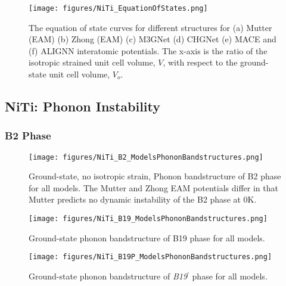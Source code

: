 \documentclass[preprint]{elsarticle}
\begin{document}
\begin{figure}[ht!]
    \begin{centering}
        \texttt{[image: figures/NiTi\_EquationOfStates.png]}
        \caption{
            The equation of state curves for different  structures for (a) Mutter (EAM) (b) Zhong (EAM) (c) M3GNet (d) CHGNet (e) MACE and (f) ALIGNN interatomic potentials. The x-axis is the ratio of the isotropic strained unit cell volume, $V$,  with respect to the ground-state unit cell volume, $V_o$.
        }
        \label{fig:eos}
    \end{centering}
\end{figure}

\subsection{NiTi: Phonon Instability}
\label{subsec:niphonons}


\subsubsection{B2 Phase}
\label{subsubsec:b2}

\begin{figure}[ht!]
    \begin{centering}
        \texttt{[image: figures/NiTi\_B2\_ModelsPhononBandstructures.png]}
        \caption{
          Ground-state, no isotropic strain, Phonon bandstructure of B2 phase for all models. The Mutter and Zhong EAM potentials differ in that Mutter predicts no dynamic instability of the B2 phase at 0K. 
        }
        \label{fig:allmodels_b2}
    \end{centering}
\end{figure}

\begin{figure}[ht!]
    \begin{centering}
        \texttt{[image: figures/NiTi\_B19\_ModelsPhononBandstructures.png]}
        \caption{
          Ground-state phonon bandstructure of B19 phase for all models.
        }
        \label{fig:allmodels_B19P}
    \end{centering}
\end{figure}

\begin{figure}[ht!]
    \begin{centering}
        \texttt{[image: figures/NiTi\_B19P\_ModelsPhononBandstructures.png]}
        \caption{
          Ground-state phonon bandstructure of \textit{B19}$^\prime$ phase for all models.
        }
        \label{fig:allmodels_B19P}
    \end{centering}
\end{figure}
\end{document}
